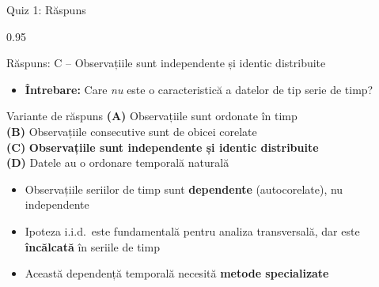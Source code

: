 \documentclass[9pt, aspectratio=169, t]{beamer}
\begin{document}
\begin{frame}{Quiz 1: Răspuns}
    \begin{cminipage}{0.95\textwidth}
    \begin{exampleblock}{Răspuns: C -- Observațiile sunt independente și identic distribuite}
        \begin{itemize}\setlength{\itemsep}{0pt}
            \item \textbf{Întrebare:} Care \emph{nu} este o caracteristică a datelor de tip serie de timp?
        \end{itemize}

        \vspace{0.3cm}

    \begin{block}{Variante de răspuns}
        \textcolor{MainBlue}{\textbf{(A)}} Observațiile sunt ordonate în timp \incorrect\\[3pt]
        \textcolor{MainBlue}{\textbf{(B)}} Observațiile consecutive sunt de obicei corelate \incorrect\\[3pt]
        \textcolor{MainBlue}{\textbf{(C)}} \textbf{\textcolor{Forest}{Observațiile sunt independente și identic distribuite}} \correct\\[3pt]
        \textcolor{MainBlue}{\textbf{(D)}} Datele au o ordonare temporală naturală \incorrect
    \end{block}

        \vspace{0.3cm}

        \begin{itemize}\setlength{\itemsep}{0pt}
            \item Observațiile seriilor de timp sunt \textbf{dependente} (autocorelate), nu independente
            \item Ipoteza i.i.d.\ este fundamentală pentru analiza transversală, dar este \textbf{încălcată} în seriile de timp
            \item Această dependență temporală necesită \textbf{metode specializate}
        \end{itemize}
    \end{exampleblock}
    
    \end{cminipage}
\end{frame}
\end{document}
